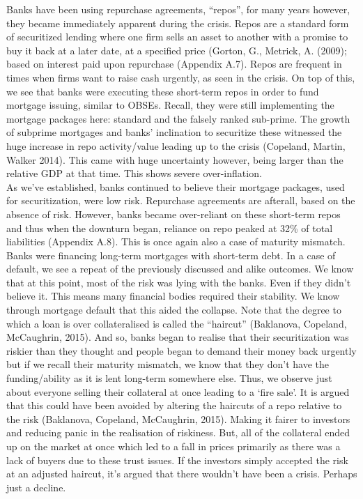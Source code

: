 \documentclass[11pt, english]{article}
\begin{document}
	Banks have been using repurchase agreements, ``repos'', for many years however, they became immediately apparent during the crisis. Repos are a standard form of securitized lending where one firm sells an asset to another with a promise to buy it back at a later date, at a specified price (Gorton, G., Metrick, A. (2009); based on interest paid upon repurchase (Appendix A.7). Repos are frequent in times when firms want to raise cash urgently, as seen in the crisis. On top of this, we see that banks were executing these short-term repos in order to fund mortgage issuing, similar to OBSEs. Recall, they were still implementing the mortgage packages here: standard and the falsely ranked sub-prime. The growth of subprime mortgages and banks’ inclination to securitize these witnessed the huge increase in repo activity/value leading up to the crisis (Copeland, Martin, Walker 2014). This came with huge uncertainty however, being larger than the relative GDP at that time. This shows severe over-inflation.\\

	As we’ve established, banks continued to believe their mortgage packages, used for securitization, were low risk. Repurchase agreements are afterall, based on the absence of risk. However, banks became over-reliant on these short-term repos and thus when the downturn began, reliance on repo peaked at 32\% of total liabilities (Appendix A.8). This is once again also a case of maturity mismatch. Banks were financing long-term mortgages with short-term debt. In a case of default, we see a repeat of the previously discussed and alike outcomes. We know that at this point, most of the risk was lying with the banks. Even if they didn’t believe it. This means many financial bodies required their stability. We know through mortgage default that this aided the collapse. Note that the degree to which a loan is over collateralised is called the “haircut” (Baklanova, Copeland, McCaughrin, 2015). And so, banks began to realise that their securitization was riskier than they thought and people began to demand their money back urgently but if we recall their maturity mismatch, we know that they don’t have the funding/ability as it is lent long-term somewhere else. Thus, we observe just about everyone selling their collateral at once leading to a `fire sale'. It is argued that this could have been avoided by altering the haircuts of a repo relative to the risk (Baklanova, Copeland, McCaughrin, 2015). Making it fairer to investors and reducing panic in the realisation of riskiness. But, all of the collateral ended up on the market at once which led to a fall in prices primarily as there was a lack of buyers due to these trust issues. If the investors simply accepted the risk at an adjusted haircut, it’s argued that there wouldn’t have been a crisis. Perhaps just a decline.\\
\end{document}

